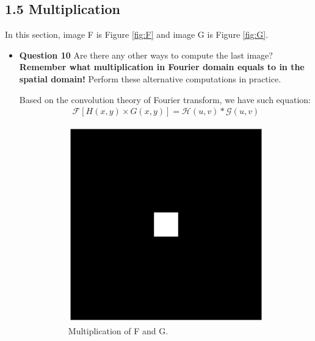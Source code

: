 \documentclass[11pt,a4paper]{article}
\begin{document}
\subsection*{1.5 Multiplication}
\par In this section, image F is Figure \ref{fig:F} and image G is Figure \ref{fig:G}.
\begin{itemize}
	\item \textbf{Question 10} Are there any other ways to compute the last image? \textbf{Remember what multiplication in Fourier domain equals to in the spatial domain!} Perform these alternative computations in practice.
	\par Based on the convolution theory of Fourier transform, we have such equation:
	\begin{align}
		\mathcal{F}[H(x,y) \times G(x,y)] = \mathcal{H}(u,v) * \mathcal{G}(u,v) \label{equ:convolutionTheory}
	\end{align}
	\begin{figure}[!ht]
		\centering 
		\begin{subfigure}[t]{.32\linewidth} %
		\includegraphics[width=\columnwidth]{Multiplication_F_G.eps}
		\caption{\scriptsize Multiplication of F and G.}
		\label{fig:F*G}
		\end{subfigure}
		\begin{subfigure}[t]{.32\linewidth} %

\end{subfigure}
\end{figure}
\end{itemize}
\end{document}
